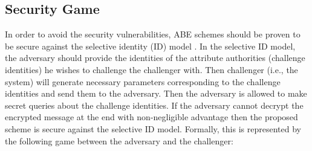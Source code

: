 \documentclass[10pt,journal]{IEEEtran}
\begin{document}
\subsection{Security Game}
In order to avoid the security vulnerabilities, ABE schemes should be proven to be secure against the selective identity (ID) model \cite{FIBE}. In the selective ID model, the adversary should provide the identities of the attribute authorities (challenge identities) he wishes to challenge the challenger with. Then challenger (i.e., the system) will generate necessary parameters corresponding to the challenge identities  and send them to the adversary. Then the adversary is allowed to make secret queries about the challenge identities. If the adversary cannot decrypt the encrypted message at the end with non-negligible advantage then the proposed scheme is secure against the selective ID model. Formally, this is represented by the following game between the adversary and the challenger:\\
\end{document}
